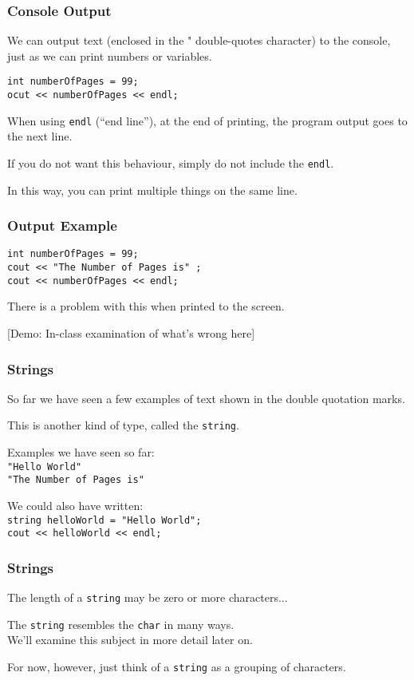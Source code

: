\begin{frame}
\frametitle{Console Output}

We can output text (enclosed in the " double-quotes character) to the console, just as we can print numbers or variables.

\texttt{int numberOfPages = 99;}\\
\texttt{ocut << numberOfPages << endl;}

When using \texttt{endl} (``end line''), at the end of printing, the program output goes to the next line.

If you do not want this behaviour, simply do not include the \texttt{endl}.

In this way, you can print multiple things on the same line.

\end{frame}

\begin{frame}
\frametitle{Output Example}

\texttt{int numberOfPages = 99;}\\
\texttt{cout << "The Number of Pages is" ;}\\
\texttt{cout <<  numberOfPages << endl;}

There is a problem with this when printed to the screen.

[Demo: In-class examination of what's wrong here]

\end{frame}

\begin{frame}
\frametitle{Strings}
So far we have seen a few examples of text shown in the double quotation marks.

This is another kind of type, called the \alert{\texttt{string}}.

Examples we have seen so far:\\
\texttt{"Hello World"}\\
\texttt{"The Number of Pages is"}

We could also have written:\\
\texttt{string helloWorld = "Hello World";}\\
\texttt{cout << helloWorld << endl;}

\end{frame}

\begin{frame}
\frametitle{Strings}
The length of a \texttt{string} may be zero or more characters...

The \texttt{string} resembles the \texttt{char} in many ways.\\
\quad We'll examine this subject in more detail later on.

For now, however, just think of a \texttt{string} as a grouping of characters.

\end{frame}

